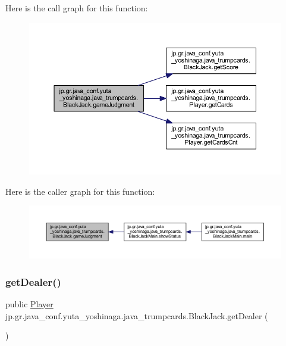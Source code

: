 Here is the call graph for this function\+:
\nopagebreak
\begin{figure}[H]
\begin{center}
\leavevmode
\includegraphics[width=350pt]{classjp_1_1gr_1_1java__conf_1_1yuta__yoshinaga_1_1java__trumpcards_1_1_black_jack_a26f4a11e36c237ec64f08010b8ea0a01_cgraph}
\end{center}
\end{figure}
Here is the caller graph for this function\+:
\nopagebreak
\begin{figure}[H]
\begin{center}
\leavevmode
\includegraphics[width=350pt]{classjp_1_1gr_1_1java__conf_1_1yuta__yoshinaga_1_1java__trumpcards_1_1_black_jack_a26f4a11e36c237ec64f08010b8ea0a01_icgraph}
\end{center}
\end{figure}
\mbox{\label{classjp_1_1gr_1_1java__conf_1_1yuta__yoshinaga_1_1java__trumpcards_1_1_black_jack_ae3829512336f2ca3f931924b435c8593}} 
\subsubsection{\texorpdfstring{get\+Dealer()}{getDealer()}}
{\footnotesize\ttfamily public \hyperlink{classjp_1_1gr_1_1java__conf_1_1yuta__yoshinaga_1_1java__trumpcards_1_1_player}{Player} jp.\+gr.\+java\+\_\+conf.\+yuta\+\_\+yoshinaga.\+java\+\_\+trumpcards.\+Black\+Jack.\+get\+Dealer (\begin{DoxyParamCaption}{ }\end{DoxyParamCaption})}



